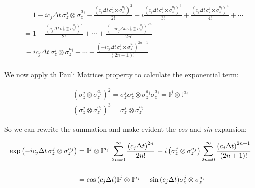 \documentclass[a4paper,12pt]{article}
\begin{document}
	\begin{align*}
		&= 1 - i c_j \Delta t \, \sigma_{z}^{j} \otimes \sigma_{z}^{a_j} - \frac{\left( c_j \Delta t \, \sigma_{z}^{j} \otimes \sigma_{z}^{a_j} \right)^2}{2!} + i \frac{\left( c_j \Delta t \, \sigma_{z}^{j} \otimes \sigma_{z}^{a_j} \right)^3}{3!} + \frac{\left( c_j \Delta t \, \sigma_{z}^{j} \otimes \sigma_{z}^{a_j} \right)^4}{4!} + \cdots  \\
		&=1 - \frac{\left( c_j \Delta t \, \sigma_{z}^{j} \otimes \sigma_{z}^{a_j} \right)^2}{2!} + \cdots  + \frac{\left( -i c_j \Delta t \, \sigma_{z}^{j} \otimes \sigma_{z}^{a_j} \right)^{{2n}}}{2n!}  \\
		&\,- i c_j\Delta t \, \sigma_{z}^{j} \otimes \sigma_{z}^{a_j} + \cdots  + \frac{\left( -i c_j \Delta t \, \sigma_{z}^{j} \otimes \sigma_{z}^{a_j} \right)^{{2n+1}}}{(2n+1)!} \\
	\end{align*}

	\begin{flushleft}
		We now apply th Pauli Matrices property to calculate the exponential term:
	\end{flushleft}

	\begin{gather}
		\left(\sigma_{z}^{j} \otimes \sigma_{z}^{a_j} \right)^{2} = \sigma_{z}^{j} \sigma_{z}^{j} \otimes \sigma_{z}^{a_j} \sigma_{z}^{a_j} = \mathbb{I}^{j} \otimes \mathbb{I}^{a_j} \\
		\left(\sigma_{z}^{j} \otimes \sigma_{z}^{a_j} \right)^{3} = \sigma_{z}^{j} \otimes \sigma_{z}^{a_j}
		\label{eq:pauli_matrix_prop}
	\end{gather}

	\begin{flushleft}
		So we can rewrite the summation and make evident the \textit{cos} and \textit{sin} expansion:
	\end{flushleft}

	\begin{align}
		\exp{\left( -i c_j \Delta t \, \sigma_{z}^{j} \otimes \sigma_{z}^{a_j} \right)} &=\mathbb{I}^{j} \otimes \mathbb{I}^{a_j} \, \sum_{2n=0}^{\infty}
		{ \frac{\left( c_j \Delta t \right)^{{2n}}}{2n!} } \,  - i \left(\sigma_{z}^{j} \otimes \sigma_{z}^{a_j} \right) \sum_{2n=0}^{\infty}{ \frac{\left( c_j \Delta t  \right)^{{2n+1}}}{(2n+1)!} } \notag \\
		\notag \\
		&= \cos{\left(c_j \Delta t\right)} \mathbb{I}^{j} \otimes \mathbb{I}^{a_j} \, - \sin{\left(c_j \Delta t \right)} \sigma_{z}^{j} \otimes \sigma_{z}^{a_j}
		\label{eq:U_diff_reconstruction}
	\end{align}
\end{document}
